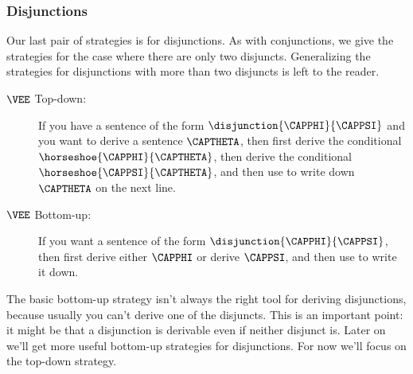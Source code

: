 \begin{gproof}
\end{gproof}

\subsubsection*{Disjunctions}
Our last pair of strategies is for disjunctions. As with conjunctions, we give the strategies for the case where there are only two disjuncts. Generalizing the strategies for disjunctions with more than two disjuncts is left to the reader.
\begin{description}
\item[$\VEE$ Top-down:] If you have a sentence of the form $\disjunction{\CAPPHI}{\CAPPSI}$ and you want to derive a sentence $\CAPTHETA$, then first derive the conditional $\horseshoe{\CAPPHI}{\CAPTHETA}$, then derive the conditional $\horseshoe{\CAPPSI}{\CAPTHETA}$, and then use  to write down $\CAPTHETA$ on the next line.
\item[$\VEE$ Bottom-up:] If you want a sentence of the form $\disjunction{\CAPPHI}{\CAPPSI}$, then first derive either $\CAPPHI$ or derive $\CAPPSI$, and then use  to write it down.
\end{description}
The basic bottom-up strategy isn't always the right tool for deriving disjunctions, because usually you can't derive one of the disjuncts. 
This is an important point: it might be that a disjunction is derivable even if neither disjunct is. 
Later on we'll get more useful bottom-up strategies for disjunctions. For now we'll focus on the top-down strategy. 

